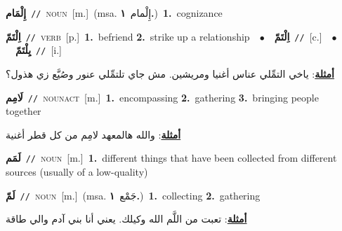 \documentclass[10pt,a4paper,twoside]{article} %
\begin{document}
\begin{multicols}{2}
{\setlength\topsep{0pt}\textbf{\foreignlanguage{arabic}{إِلْمَام}}\ {\color{gray}\texttt{//}\color{black}}\ \textsc{noun}\ [m.]\ \color{gray}(msa. \foreignlanguage{arabic}{إِلْمام}~\foreignlanguage{arabic}{\textbf{١.}})\color{black}\ \textbf{1.}~cognizance\ } \vspace{2mm}

{\setlength\topsep{0pt}\textbf{\foreignlanguage{arabic}{اِلْتَمّ}}\ {\color{gray}\texttt{//}\color{black}}\ \textsc{verb}\ [p.]\ \textbf{1.}~befriend  \textbf{2.}~strike up a relationship\ \ $\bullet$\ \ \setlength\topsep{0pt}\textbf{\foreignlanguage{arabic}{اِلْتَمّ}}\ {\color{gray}\texttt{//}\color{black}}\ [c.]\ \ $\bullet$\ \ \setlength\topsep{0pt}\textbf{\foreignlanguage{arabic}{يِلْتَمّ}}\ {\color{gray}\texttt{//}\color{black}}\ [i.]\  \begin{flushright}\color{gray}\foreignlanguage{arabic}{\textbf{\underline{\foreignlanguage{arabic}{أمثلة}}}: ياخي التمِّلي عناس أغنيا ومريشين. مش جاي تلتمِّلي عنور وصُيَّع زي هذول؟}\end{flushright}\color{black}} \vspace{2mm}

{\setlength\topsep{0pt}\textbf{\foreignlanguage{arabic}{لَامِم}}\ {\color{gray}\texttt{//}\color{black}}\ \textsc{noun\textunderscore act}\ [m.]\ \textbf{1.}~encompassing  \textbf{2.}~gathering  \textbf{3.}~bringing people together\  \begin{flushright}\color{gray}\foreignlanguage{arabic}{\textbf{\underline{\foreignlanguage{arabic}{أمثلة}}}: والله هالمعهد لامِم من كل قطر أغنية}\end{flushright}\color{black}} \vspace{2mm}

{\setlength\topsep{0pt}\textbf{\foreignlanguage{arabic}{لَمَم}}\ {\color{gray}\texttt{//}\color{black}}\ \textsc{noun}\ [m.]\ \textbf{1.}~different things that have been collected from different sources (usually of a low-quality)\ } \vspace{2mm}

{\setlength\topsep{0pt}\textbf{\foreignlanguage{arabic}{لَمّ}}\ {\color{gray}\texttt{//}\color{black}}\ \textsc{noun}\ [m.]\ \color{gray}(msa. \foreignlanguage{arabic}{جَمْع}~\foreignlanguage{arabic}{\textbf{١.}})\color{black}\ \textbf{1.}~collecting  \textbf{2.}~gathering\  \begin{flushright}\color{gray}\foreignlanguage{arabic}{\textbf{\underline{\foreignlanguage{arabic}{أمثلة}}}: تعبت من اللَّم الله وكيلك. يعني أنا بني آدم والي طاقة}\end{flushright}\color{black}} \vspace{2mm}


\end{multicols}
\end{document}
